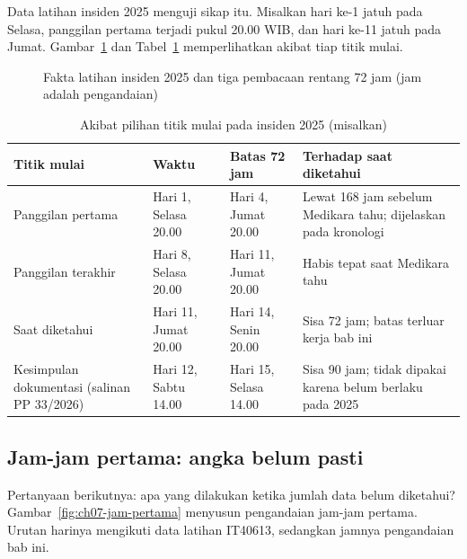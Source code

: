 Data latihan insiden 2025 menguji sikap itu. Misalkan hari ke-1 jatuh pada Selasa, panggilan pertama
terjadi pukul 20.00 WIB, dan hari ke-11 jatuh pada Jumat. Gambar~\ref{fig:ch07-titik-mulai} dan
Tabel~\ref{tab:ch07-titik-mulai} memperlihatkan akibat tiap titik mulai.

\begin{figure}[!htb]
  \centering
  
  \caption{Fakta latihan insiden 2025 dan tiga pembacaan rentang 72 jam (jam adalah pengandaian)}
  \label{fig:ch07-titik-mulai}
\end{figure}

\begin{table}[!htb]
  \centering\small
  \caption{Akibat pilihan titik mulai pada insiden 2025 (misalkan)}\label{tab:ch07-titik-mulai}
  \begin{tabularx}{\textwidth}{|>{\raggedright\arraybackslash}p{}|>{\raggedright\arraybackslash}p{}|>{\raggedright\arraybackslash}p{}|>{\raggedright\arraybackslash}X|}
    \hline
    \textbf{Titik mulai} & \textbf{Waktu} & \textbf{Batas 72 jam} & \textbf{Terhadap saat diketahui}
    \\ \hline
    Panggilan pertama & Hari 1, Selasa 20.00 & Hari 4, Jumat 20.00 & Lewat 168 jam sebelum Medikara
    tahu; dijelaskan pada kronologi \\ \hline
    Panggilan terakhir & Hari 8, Selasa 20.00 & Hari 11, Jumat 20.00 & Habis tepat saat Medikara
    tahu \\ \hline
    Saat diketahui & Hari 11, Jumat 20.00 & Hari 14, Senin 20.00 & Sisa 72 jam; batas terluar kerja
    bab ini \\ \hline
    Kesimpulan dokumentasi (salinan PP 33/2026) & Hari 12, Sabtu 14.00 & Hari 15, Selasa 14.00 &
    Sisa 90 jam; tidak dipakai karena belum berlaku pada 2025 \\ \hline
  \end{tabularx}
\end{table}

\subsection*{Jam-jam pertama: angka belum pasti}

Pertanyaan berikutnya: apa yang dilakukan ketika jumlah data belum diketahui?
Gambar~\ref{fig:ch07-jam-pertama} menyusun pengandaian jam-jam pertama. Urutan harinya mengikuti
data latihan IT40613, sedangkan jamnya pengandaian bab ini.

